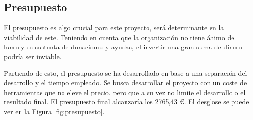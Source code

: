 \subsection{Presupuesto}

El presupuesto es algo crucial para este proyecto, será determinante en la viabilidad de este. Teniendo en cuenta que la organización no tiene ánimo de lucro y se sustenta de donaciones y ayudas, el invertir una gran suma de dinero podría ser inviable.

Partiendo de esto, el presupuesto se ha desarrollado en base a una separación del desarrollo y el tiempo empleado. Se busca desarrollar el proyecto con un coste de herramientas que no eleve el precio, pero que a su vez no limite el desarrollo o el resultado final. El presupuesto final alcanzaría los 2765,43 €. El desglose se puede ver en la Figura \ref{fig:presupuesto}.

